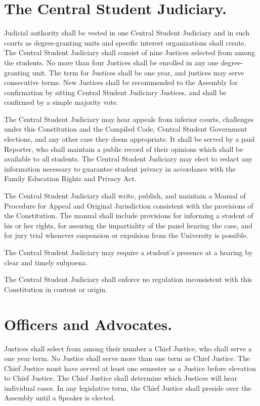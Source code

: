 \section{The Central Student Judiciary.}
    Judicial authority shall be vested in one Central Student Judiciary and in such courts as degree-granting units and specific interest organizations shall create. The Central Student Judiciary shall consist of nine Justices selected from among the students. No more than four Justices shall be enrolled in any one degree-granting unit. The term for Justices shall be one year, and justices may serve consecutive terms. New Justices shall be recommended to the Assembly for confirmation by sitting Central Student Judiciary Justices, and shall be confirmed by a simple majority vote.

    The Central Student Judiciary may hear appeals from inferior courts, challenges under this Constitution and the Compiled Code, Central Student Government elections, and any other case they deem appropriate. It shall be served by a paid Reporter, who shall maintain a public record of their opinions which shall be available to all students. The Central Student Judiciary may elect to redact any information necessary to guarantee student privacy in accordance with the Family Education Rights and Privacy Act.

   The Central Student Judiciary shall write, publish, and maintain a Manual of Procedure for Appeal and Original Jurisdiction consistent with the provisions of the Constitution. The manual shall include provisions for informing a student of his or her rights, for assuring the impartiality of the panel hearing the case, and for jury trial whenever suspension or expulsion from the University is possible.

    The Central Student Judiciary may require a student's presence at a hearing by clear and timely subpoena.

    The Central Student Judiciary shall enforce no regulation inconsistent with this Constitution in content or origin.

\section{Officers and Advocates.}
    Justices shall select from among their number a Chief Justice, who shall serve a one year term. No Justice shall serve more than one term as Chief Justice. The Chief Justice must have served at least one semester as a Justice before elevation to Chief Justice. The Chief Justice shall determine which Justices will hear individual cases. In any legislative term, the Chief Justice shall preside over the Assembly until a Speaker is elected.

